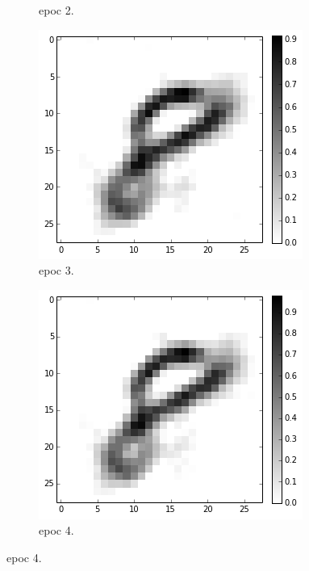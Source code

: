\begin{figure}[hbt]
\begin{subfigure}[t]{0.18\textwidth}
			\caption{epoc 2.}
		\end{subfigure}
		\begin{subfigure}[t]{0.18\textwidth}
			\includegraphics[width=\textwidth]{pics_sdbn/b10_epoc3.png}
			\caption{epoc 3.}
		\end{subfigure}
		\begin{subfigure}[t]{0.18\textwidth}
			\includegraphics[width=\textwidth]{pics_sdbn/b10_epoc4.png}
			\caption{epoc 4.}
		\end{subfigure}

\end{figure}
